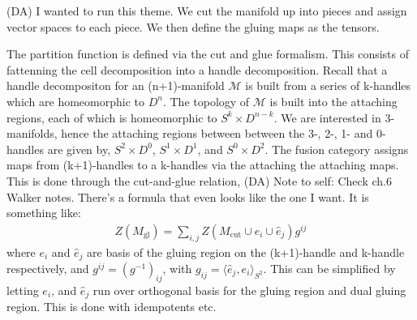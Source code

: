 \documentclass[12pt,a4paper]{article}
\newcommand{\mcm}{\mathcal{M}}
\newcommand{\dave}[1]{{\color{ao(english)}\footnotesize{(DA) #1}}}
\begin{document}
\dave{I wanted to run this theme.
We cut the manifold up into pieces and assign vector spaces to each piece.
We then define the gluing maps as the tensors.}

The partition function is defined via the cut and glue formalism. 
This consists of fattenning the cell decomposition into a handle decomposition. 
Recall that a handle decompositon for an (n+1)-manifold $\mcm$ is built from a series of k-handles which are homeomorphic to $D^n$. 
The topology of $\mcm$ is built into the attaching regions, each of which is homeomorphic to $S^k \times D^{n-k}$.
We are interested in 3-manifolds,
hence the attaching regions between between the 3-, 2-, 1- and 0-handles are given by,
$S^2 \times D^0$, $S^1 \times D^1$, and $S^{0} \times D^2$.
The fusion category assigns maps from (k+1)-handles to a k-handles via the attaching the attaching maps. 
This is done through the cut-and-glue relation,
\dave{Note to self: Check ch.6 Walker notes.
There's a formula that even looks like the one I want.
It is something like:
}
\begin{align}
Z(M_{\text{gl}}) = \sum_{i,j}Z(M_{\text{cut}} \cup e_i \cup \hat{e}_j)g^{ij}
\end{align}
where $e_i$ and $\hat{e}_j$ are basis of the gluing region on the (k+1)-handle and k-handle respectively, 
and $g^{ij} = (g^{-1})_{ij} $, with $g_{ij} = \langle \hat{e}_j, e_i \rangle_{S^2}$.
This can be simplified by letting $e_i$, and $\hat{e}_j$ run over orthogonal basis for the gluing region and dual gluing region. 
This is done with idempotents etc. 
\end{document}
